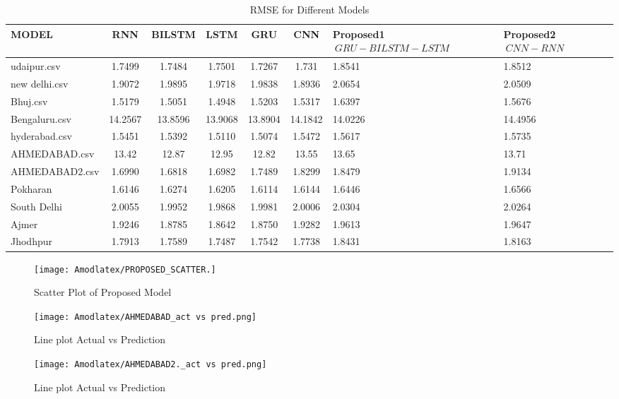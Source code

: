 \documentclass[a4paper,fleqn]{cas-sc}
\begin{document}
\begin{table}[!ht]
\centering
\caption{RMSE for Different Models}
\begin{tabular}{|l|c|c|c|c|c|p{}|p{}|}
\hline
\textbf{MODEL} & \textbf{RNN} & \textbf{BILSTM} & \textbf{LSTM} & \textbf{GRU} & \textbf{CNN} &\textbf{Proposed1 \(\ GRU-BILSTM-LSTM \)\ } & \textbf{Proposed2 \(\ CNN-RNN\)\ } \\ \hline
udaipur.csv & 1.7499 & 1.7484 & 1.7501 & 1.7267 & 1.731 & 1.8541 & 1.8512 \\ \hline
new delhi.csv & 1.9072 & 1.9895 & 1.9718 & 1.9838 & 1.8936 & 2.0654 & 2.0509 \\ \hline
Bhuj.csv & 1.5179 & 1.5051 & 1.4948 & 1.5203 & 1.5317 & 1.6397 & 1.5676 \\ \hline
Bengaluru.csv & 14.2567 & 13.8596 & 13.9068 & 13.8904 & 14.1842 & 14.0226 & 14.4956 \\ \hline
hyderabad.csv & 1.5451 & 1.5392 & 1.5110 & 1.5074 & 1.5472 & 1.5617 & 1.5735 \\ \hline
AHMEDABAD.csv & 13.42 & 12.87 & 12.95 & 12.82 & 13.55 & 13.65 & 13.71 \\ \hline
AHMEDABAD2.csv & 1.6990 & 1.6818 & 1.6982 & 1.7489 & 1.8299 & 1.8479 & 1.9134 \\ \hline
Pokharan & 1.6146 & 1.6274 & 1.6205 & 1.6114 & 1.6144 & 1.6446 & 1.6566 \\ \hline
South Delhi & 2.0055 & 1.9952 & 1.9868 & 1.9981 & 2.0006 & 2.0304 & 2.0264 \\ \hline
Ajmer & 1.9246 & 1.8785 & 1.8642 & 1.8750 & 1.9282 & 1.9613 & 1.9647 \\ \hline
Jhodhpur & 1.7913 & 1.7589 & 1.7487 & 1.7542 & 1.7738 & 1.8431 & 1.8163 \\ \hline

\end{tabular}
\end{table}

\begin{figure}[!ht]
\centering
\texttt{[image: Amodlatex/PROPOSED\_SCATTER.]}
\caption{Scatter Plot of Proposed Model}
\label{Line plot1}
\end{figure}


\begin{figure}[!ht]
\centering
\texttt{[image: Amodlatex/AHMEDABAD\_act vs pred.png]}
\caption{Line plot Actual vs Prediction}
\label{Line plot2}
\end{figure}


\begin{figure}[!ht]
\centering
\texttt{[image: Amodlatex/AHMEDABAD2.\_act vs pred.png]}
\caption{Line plot Actual vs Prediction}
\label{Line plot3}
\end{figure}
\end{document}
